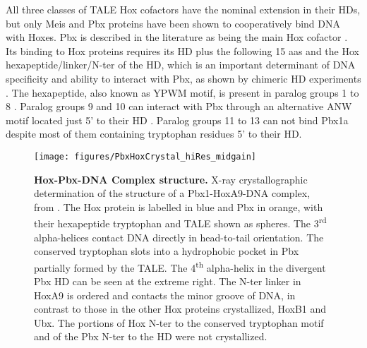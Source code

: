 All three classes of \ac{TALE} Hox cofactors have the nominal extension in their \acp{HD}, but only Meis and Pbx proteins have been shown to cooperatively bind DNA with Hoxes. Pbx is described in the literature as being the main Hox cofactor \cite{ref}. Its binding to Hox proteins requires its \ac{HD} plus the following 15 \acp{aa} and the Hox hexapeptide/linker/\ac{N-ter} of the \ac{HD}, which is an important determinant of DNA specificity and ability to interact with Pbx, as shown by chimeric \ac{HD} experiments \parencite{Chang1996, Phelan1997}. The hexapeptide, also known as YPWM motif, is present in paralog groups 1 to 8 \parencite{Chang1995, Passner1999}. Paralog groups 9 and 10 can interact with Pbx through an alternative ANW motif located just 5' to their \ac{HD} \parencite{Chang1996, Shen1997a}. Paralog groups 11 to 13 can not bind Pbx1a despite most of them containing tryptophan residues 5' to their \ac{HD}. 

\begin{figure}[]
  \centering
  \texttt{[image: figures/PbxHoxCrystal\_hiRes\_midgain]}
  \caption[Hox-Pbx-DNA Complex structure]{\textbf{Hox-Pbx-DNA Complex structure.} X-ray crystallographic determination of the structure of a Pbx1-HoxA9-DNA complex, from \cite{LaRonde-LeBlanc2003}. The Hox protein is labelled in blue and Pbx in orange, with their hexapeptide tryptophan and \ac{TALE} shown as spheres. The 3\textsuperscript{rd} alpha-helices contact DNA directly in head-to-tail orientation. The conserved tryptophan slots into a hydrophobic pocket in Pbx partially formed by the \ac{TALE}. The 4\textsuperscript{th} alpha-helix in the divergent Pbx \ac{HD} can be seen at the extreme right. The \ac{N-ter} linker in HoxA9 is ordered and contacts the minor groove of DNA, in contrast to those in the other Hox proteins crystallized, HoxB1 and Ubx. The portions of Hox \ac{N-ter} to the conserved tryptophan motif and of the Pbx \ac{N-ter} to the \ac{HD} were not crystallized.}
  \label{fig:PbxHoxCrystal}
\end{figure}


